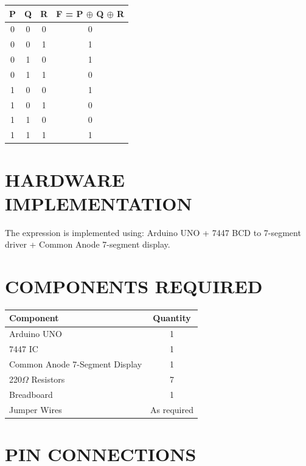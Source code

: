 \documentclass[12pt,a4paper]{article}
\begin{document}
\begin{center}
\begin{tabular}{|c|c|c|c|}
\hline
P & Q & R & F = P $\oplus$ Q $\oplus$ R \\
\hline
0 & 0 & 0 & 0 \\
0 & 0 & 1 & 1 \\
0 & 1 & 0 & 1 \\
0 & 1 & 1 & 0 \\
1 & 0 & 0 & 1 \\
1 & 0 & 1 & 0 \\
1 & 1 & 0 & 0 \\
1 & 1 & 1 & 1 \\
\hline
\end{tabular}
\end{center}

\section*{HARDWARE IMPLEMENTATION}

The expression is implemented using:
Arduino UNO + 7447 BCD to 7-segment driver + Common Anode 7-segment display.

\section*{COMPONENTS REQUIRED}

\begin{center}
\begin{tabular}{|l|c|}
\hline
Component & Quantity \\
\hline
Arduino UNO & 1 \\
7447 IC & 1 \\
Common Anode 7-Segment Display & 1 \\
220$\Omega$ Resistors & 7 \\
Breadboard & 1 \\
Jumper Wires & As required \\
\hline
\end{tabular}
\end{center}

\section*{PIN CONNECTIONS}
\end{document}
